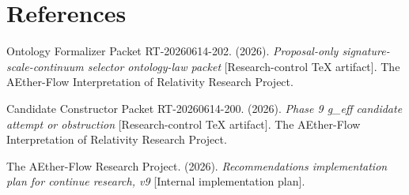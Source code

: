 \documentclass[11pt]{article}
\begin{document}
\section*{References}

Ontology Formalizer Packet RT-20260614-202. (2026). \textit{Proposal-only
signature-scale-continuum selector ontology-law packet} [Research-control TeX
artifact]. The AEther-Flow Interpretation of Relativity Research Project.

Candidate Constructor Packet RT-20260614-200. (2026). \textit{Phase 9
g\_eff candidate attempt or obstruction} [Research-control TeX artifact]. The
AEther-Flow Interpretation of Relativity Research Project.

The AEther-Flow Research Project. (2026). \textit{Recommendations
implementation plan for continue research, v9} [Internal implementation plan].
\end{document}
